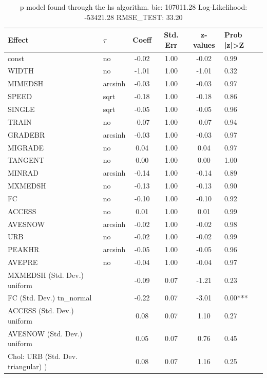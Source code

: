 \begin{table}
	\caption{p model found through the hs algorithm. bic: 107011.28 Log-Likelihood: -53421.28 RMSE_TEST: 33.20}
	\begin{center}
		\begin{tabular}{|l|l|c|c|c|l|}
			\hline
			Effect & $\tau$ & Coeff & Std. Err & z-values & Prob |z|>Z \\
			\hline
			const & no & -0.02 & 1.00 & -0.02 & 0.99 \\
			\hline
			WIDTH & no & -1.01 & 1.00 & -1.01 & 0.32 \\
			\hline
			MIMEDSH & arcsinh & -0.03 & 1.00 & -0.03 & 0.97 \\
			\hline
			SPEED & sqrt & -0.18 & 1.00 & -0.18 & 0.86 \\
			\hline
			SINGLE & sqrt & -0.05 & 1.00 & -0.05 & 0.96 \\
			\hline
			TRAIN & no & -0.07 & 1.00 & -0.07 & 0.94 \\
			\hline
			GRADEBR & arcsinh & -0.03 & 1.00 & -0.03 & 0.97 \\
			\hline
			MIGRADE & no & 0.04 & 1.00 & 0.04 & 0.97 \\
			\hline
			TANGENT & no & 0.00 & 1.00 & 0.00 & 1.00 \\
			\hline
			MINRAD & arcsinh & -0.14 & 1.00 & -0.14 & 0.89 \\
			\hline
			MXMEDSH & no & -0.13 & 1.00 & -0.13 & 0.90 \\
			\hline
			FC & no & -0.10 & 1.00 & -0.10 & 0.92 \\
			\hline
			ACCESS & no & 0.01 & 1.00 & 0.01 & 0.99 \\
			\hline
			AVESNOW & arcsinh & -0.02 & 1.00 & -0.02 & 0.98 \\
			\hline
			URB & no & -0.02 & 1.00 & -0.02 & 0.99 \\
			\hline
			PEAKHR & arcsinh & -0.05 & 1.00 & -0.05 & 0.96 \\
			\hline
			AVEPRE & no & -0.04 & 1.00 & -0.04 & 0.97 \\
			\hline
			MXMEDSH (Std. Dev.) uniform &  & -0.09 & 0.07 & -1.21 & 0.23 \\
			\hline
			FC (Std. Dev.) tn_normal &  & -0.22 & 0.07 & -3.01 & 0.00*** \\
			\hline
			ACCESS (Std. Dev.) uniform &  & 0.08 & 0.07 & 1.10 & 0.27 \\
			\hline
			AVESNOW (Std. Dev.) uniform &  & 0.05 & 0.07 & 0.76 & 0.45 \\
			\hline
			 Chol: URB (Std. Dev. triangular) ) &  & 0.08 & 0.07 & 1.16 & 0.25 \\

\end{tabular}
\end{center}
\end{table}
